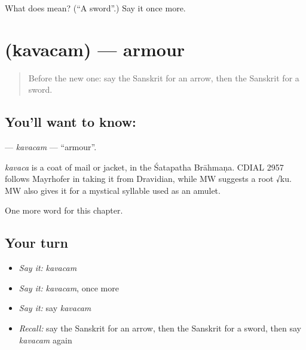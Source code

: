 \begin{tcolorbox}[breakable,colback=teal!4,colframe=teal!35!black,title={Before you move on}]
What does  mean? (\textquotedblleft{}A sword\textquotedblright{}.) Say it once more.
\end{tcolorbox}
\section[\texorpdfstring{\sk{कवचम्} (kavacam)}{कवचम् (kavacam)}]{ (kavacam) — armour}

\label{lesson:SA-C247-kavacam}



\begin{quote}
Before the new one: say the Sanskrit for an arrow, then the Sanskrit for a sword.
\end{quote}

\subsection*{You'll want to know: }
\textbf{} — \emph{kavacam} — \textquotedblleft{}armour\textquotedblright{}.

\begin{cousinweb}
\emph{kavaca} is a coat of mail or jacket, in the Śatapatha Brāhmaṇa. CDIAL 2957 follows Mayrhofer in taking it from Dravidian, while MW suggests a root √ku. MW also gives it for a mystical syllable used as an amulet.
\end{cousinweb}

\begin{grammarlens}[title={What you've built}]
One more word for this chapter.
\end{grammarlens}

\subsection*{Your turn}
\begin{itemize}
\raggedright
  \item \emph{Say it:} \emph{kavacam}
  \item \emph{Say it:} \emph{kavacam}, once more
  \item \emph{Say it:} say \emph{kavacam}
  \item \emph{Recall:} say the Sanskrit for an arrow, then the Sanskrit for a sword, then say \emph{kavacam} again
\end{itemize}

